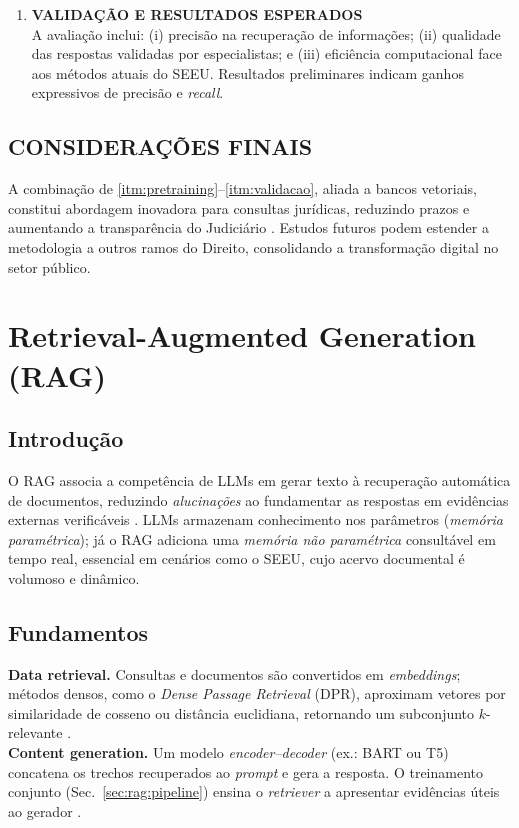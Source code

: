 \begin{description}
\begin{enumerate}[label=\textbf{2.\arabic*}, leftmargin=*]
  \item \textbf{VALIDAÇÃO E RESULTADOS ESPERADOS}\label{itm:validacao}\\
        A avaliação inclui: (i) precisão na recuperação de informações;
        (ii) qualidade das respostas validadas por especialistas; e
        (iii) eficiência computacional face aos métodos atuais do SEEU.
        Resultados preliminares indicam ganhos expressivos de precisão e
        \textit{recall}.
\end{enumerate}

\subsection*{CONSIDERAÇÕES FINAIS}
A combinação de \ref{itm:pretraining}–\ref{itm:validacao}, aliada a bancos
vetoriais, constitui abordagem inovadora para consultas jurídicas, reduzindo
prazos e aumentando a transparência do Judiciário
\cite{belarmino2025aplicacao,divald2021eformalization}. Estudos futuros podem
estender a metodologia a outros ramos do Direito, consolidando a transformação
digital no setor público.

\section{Retrieval-Augmented Generation (RAG)}
\label{sec:rag}

\subsection{Introdução}
O RAG associa a competência de LLMs em gerar texto à recuperação automática de
documentos, reduzindo \textit{alucinações} ao fundamentar as respostas em
evidências externas verificáveis
\cite{lewis2020rag,gao2023survey,edwards2024hybrid,pujiono2024implementing}.
LLMs armazenam conhecimento nos parâmetros (\emph{memória paramétrica}); já o
RAG adiciona uma \emph{memória não paramétrica} consultável em tempo real,
essencial em cenários como o SEEU, cujo acervo documental é volumoso e
dinâmico.

\subsection{Fundamentos}
\textbf{Data retrieval.} Consultas e documentos são convertidos em
\emph{embeddings}; métodos densos, como o \textit{Dense Passage Retrieval}
(DPR), aproximam vetores por similaridade de cosseno ou distância euclidiana,
retornando um subconjunto $k$-relevante
\cite{lewis2020rag,taipalus2024vector,mageirakos2025cracking}.\\
\textbf{Content generation.} Um modelo \emph{encoder--decoder} (ex.: BART ou
T5) concatena os trechos recuperados ao \textit{prompt} e gera a resposta. O
treinamento conjunto (Sec.~\ref{sec:rag:pipeline}) ensina o \textit{retriever}
a apresentar evidências úteis ao gerador
\cite{aquino2024extracting,belarmino2025aplicacao}.


\end{description}
